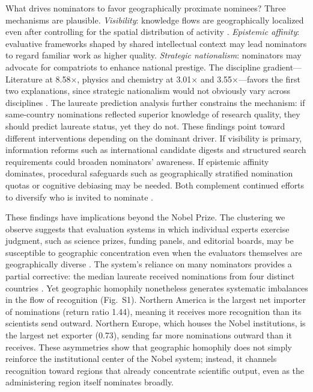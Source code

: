\documentclass[12pt]{article}
\begin{document}
What drives nominators to favor geographically proximate nominees? Three mechanisms are plausible. \emph{Visibility}: knowledge flows are geographically localized even after controlling for the spatial distribution of activity \cite{JafTraHen1993}. \emph{Epistemic affinity}: evaluative frameworks shaped by shared intellectual context may lead nominators to regard familiar work as higher quality. \emph{Strategic nationalism}: nominators may advocate for compatriots to enhance national prestige. The discipline gradient---Literature at 8.58$\times$, physics and chemistry at 3.01$\times$ and 3.55$\times$---favors the first two explanations, since strategic nationalism would not obviously vary across disciplines \cite{Lam2009, Livingstone2003}. The laureate prediction analysis further constrains the mechanism: if same-country nominations reflected superior knowledge of research quality, they should predict laureate status, yet they do not. These findings point toward different interventions depending on the dominant driver. If visibility is primary, information reforms such as international candidate digests and structured search requirements could broaden nominators' awareness. If epistemic affinity dominates, procedural safeguards such as geographically stratified nomination quotas or cognitive debiasing may be needed. Both complement continued efforts to diversify who is invited to nominate \cite{Nature2022}.

These findings have implications beyond the Nobel Prize. The clustering we observe suggests that evaluation systems in which individual experts exercise judgment, such as science prizes, funding panels, and editorial boards, may be susceptible to geographic concentration even when the evaluators themselves are geographically diverse \cite{CasFan2013, But2016}. The system's reliance on many nominators provides a partial corrective: the median laureate received nominations from four distinct countries \cite{nobelgithub}. Yet geographic homophily nonetheless generates systematic imbalances in the flow of recognition (Fig.~S1). Northern America is the largest net importer of nominations (return ratio 1.44), meaning it receives more recognition than its scientists send outward. Northern Europe, which houses the Nobel institutions, is the largest net exporter (0.73), sending far more nominations outward than it receives. These asymmetries show that geographic homophily does not simply reinforce the institutional center of the Nobel system; instead, it channels recognition toward regions that already concentrate scientific output, even as the administering region itself nominates broadly.
\end{document}
